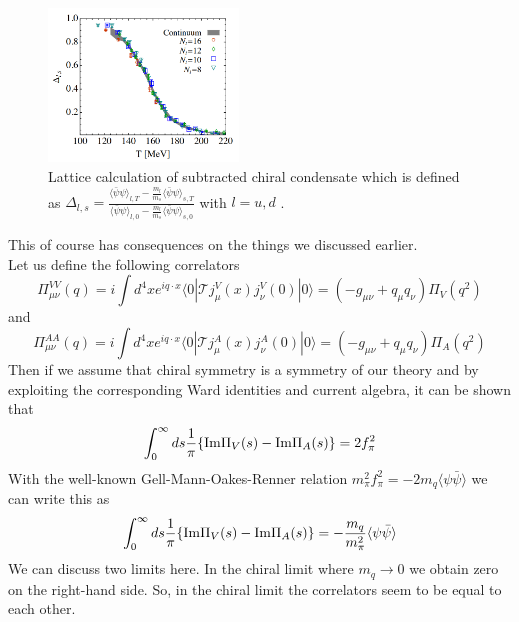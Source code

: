 \begin{figure}[b]
	\centering
	\includegraphics[width=0.45\textwidth]{Figures/ChiralOrderParameterLattice}
	\caption{Lattice calculation of subtracted chiral condensate which is defined as $ \Delta_{l,s} = \frac{\langle \bar{\psi} \psi \rangle_{l,T} - \frac{m_l}{m_s} \langle \bar{\psi} \psi \rangle_{s,T}}{\langle \bar{\psi} \psi \rangle_{l,0} - \frac{m_l}{m_s} \langle \bar{\psi} \psi \rangle_{s,0}}$ with $l = u,d$ \cite{OrdParLat}.}
	\label{fig:ordparlat}
\end{figure}
This of course has consequences on the things we discussed earlier. \\
Let us define the following correlators
\begin{equation}
\label{eqn:corV}
\Pi_{\mu\nu}^{VV} (q) = i \int d^4x e^{iq \cdot x} \langle 0 | \mathcal{T} j^V_{\mu}(x)j^V_{\nu}(0) | 0 \rangle = \left( -g_{\mu\nu} + q_{\mu}q_{\nu} \right) \Pi_V(q^2)
\end{equation}
and
\begin{equation}
\label{eqn:corA}
\Pi_{\mu\nu}^{AA} (q) = i \int d^4x e^{iq \cdot x} \langle 0 | \mathcal{T} j^A_{\mu}(x)j^A_{\nu}(0) | 0 \rangle = \left( -g_{\mu\nu} + q_{\mu}q_{\nu} \right) \Pi_A(q^2)
\end{equation}
Then if we assume that chiral symmetry is a symmetry of our theory and by exploiting the corresponding Ward identities and current algebra, it can be shown that \cite{WeinbergAVmixing}
\begin{equation}
\int_0^{\infty} ds \frac{1}{\pi} \lbrace \mathrm{Im}\Pi_V(s) - \mathrm{Im}\Pi_A(s) \rbrace = 2f_{\pi}^2
\end{equation} 
With the well-known Gell-Mann-Oakes-Renner relation $m_{\pi}^2f_{\pi}^2 = - 2 m_q \langle \psi \bar{\psi} \rangle$ we can write this as
\begin{equation}
\label{eqn:WSRGOR}
\int_0^{\infty} ds \frac{1}{\pi} \lbrace \mathrm{Im}\Pi_V(s) - \mathrm{Im}\Pi_A(s) \rbrace = - \frac{m_q}{m_{\pi}^2} \langle \psi \bar{\psi} \rangle
\end{equation}
We can discuss two limits here. In the chiral limit where $m_q \rightarrow 0$ we obtain zero on the right-hand side. So, in the chiral limit the correlators seem to be equal to each other. \\
